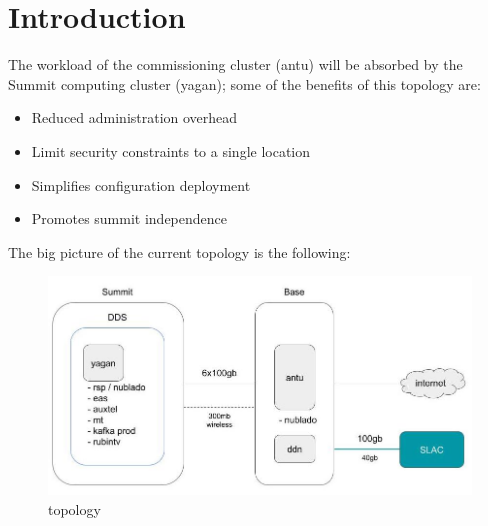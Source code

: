 \section{Introduction}

The workload of the commissioning cluster (antu) will be absorbed by the Summit computing cluster (yagan); some of the benefits of this topology are:
\begin{itemize}
    \item Reduced administration overhead 
    \item Limit security constraints to a single location
    \item Simplifies configuration deployment
    \item Promotes summit independence 
\end{itemize}
The big picture of the current topology is the following:

\begin{figure}
    \centering
    \includegraphics[width=18cm]{images/current_state.jpg}
    \caption{topology}
\end{figure}

\newpage